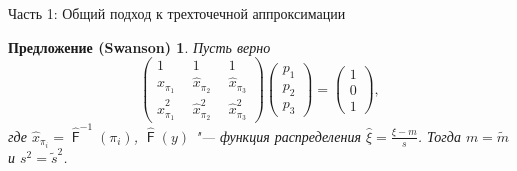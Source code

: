 \documentclass[ucs, notheorems, handout]{beamer}
\newtheorem{proposition}[theorem]{Предложение (Swanson)}
\DeclareMathOperator{\F}{\mathsf{F}}
\begin{document}
	\begin{frame}{Часть 1: Общий подход к трехточечной аппроксимации}
		\begin{proposition}\label{pr1}
			Пусть верно 
			\begin{equation*}
				\begin{pmatrix} 
					1&1&1\\ 
					\hat{x}_{\pi_{1}}~~ &  \hat{x}_{\pi_{2}}~~  & \hat{x}_{\pi_{3}} \\ 
					\hat{x}_{\pi_{1}}^{2}~~&\hat{x}_{\pi_{2}}^{2}~~  &\hat{x}_{\pi_{3}}^{2}
				\end{pmatrix}
				\begin{pmatrix}p_{1}\\p_{2}\\ p_{3}\end{pmatrix}= \begin{pmatrix}1\\0\\1 \end{pmatrix},\label{4}
			\end{equation*}
			где $\hat{x}_{\pi_{i}} = \hat{\F}^{-1}(\pi_{i})$, $\hat{\F}(y)$ "--- функция распределения $\displaystyle{\hat{\xi} = \frac{\xi-m}{s}}$. Тогда $m=\tilde{m}$ и $s^{2} = \tilde{s}^{2}$.
		\end{proposition}
	
		
	\end{frame}
	
\end{document}
